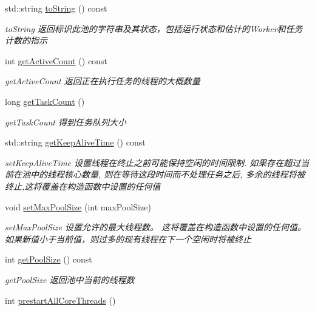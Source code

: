 \begin{DoxyCompactItemize}
std\+::string \hyperlink{classThreadPoolExecutor_af85a124c9169a546bfbd725725024527}{to\+String} () const
\begin{DoxyCompactList}\small\item\em to\+String 返回标识此池的字符串及其状态，包括运行状态和估计的\+Worker和任务计数的指示 \end{DoxyCompactList}\item 
int \hyperlink{classThreadPoolExecutor_a1a4a5262dc8db7933c27dbbc267d4825}{get\+Active\+Count} () const
\begin{DoxyCompactList}\small\item\em get\+Active\+Count 返回正在执行任务的线程的大概数量 \end{DoxyCompactList}\item 
long \hyperlink{classThreadPoolExecutor_a50b63440d1d93f3c5c19082ca538edb6}{get\+Task\+Count} ()
\begin{DoxyCompactList}\small\item\em get\+Task\+Count 得到任务队列大小 \end{DoxyCompactList}\item 
std\+::string \hyperlink{classThreadPoolExecutor_aeb35f2475788af6b98d1ca1bf8d05536}{get\+Keep\+Alive\+Time} () const
\begin{DoxyCompactList}\small\item\em set\+Keep\+Alive\+Time 设置线程在终止之前可能保持空闲的时间限制. 如果存在超过当前在池中的线程核心数量, 则在等待这段时间而不处理任务之后, 多余的线程将被终止,这将覆盖在构造函数中设置的任何值 \end{DoxyCompactList}\item 
void \hyperlink{classThreadPoolExecutor_a83e9e3715fdacc5b2f08b563d39bb62b}{set\+Max\+Pool\+Size} (int max\+Pool\+Size)
\begin{DoxyCompactList}\small\item\em set\+Max\+Pool\+Size 设置允许的最大线程数。 这将覆盖在构造函数中设置的任何值。 如果新值小于当前值，则过多的现有线程在下一个空闲时将被终止 \end{DoxyCompactList}\item 
int \hyperlink{classThreadPoolExecutor_af67082427f76bd9b14b2dabf43f96300}{get\+Pool\+Size} () const
\begin{DoxyCompactList}\small\item\em get\+Pool\+Size 返回池中当前的线程数 \end{DoxyCompactList}\item 
int \hyperlink{classThreadPoolExecutor_ad7dd8949ce60dd7b835dae26ea4e7e88}{prestart\+All\+Core\+Threads} ()

\end{DoxyCompactItemize}
